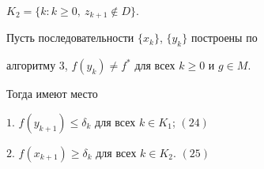 $K_2=\{k:k\ge 0,\ z_{k+1}\notin D\}$. 


 


\begin{lem} Пусть последовательности $\{x_k\}$, $\{y_k\}$ построены по 


алгоритму $3$, $f(y_k)\ne f^*$ для всех $k\ge 0$ и $g\in M$. 


Тогда имеют место 


 


$1.$ $f(y_{k+1})\le\delta_k$ для всех $k\in K_1$; \hfill $(24)$ 


 


$2.$ $f(x_{k+1})\ge\delta_k$ для всех $k\in K_2$. \hfill $(25)$ 


\end{lem} 


 


